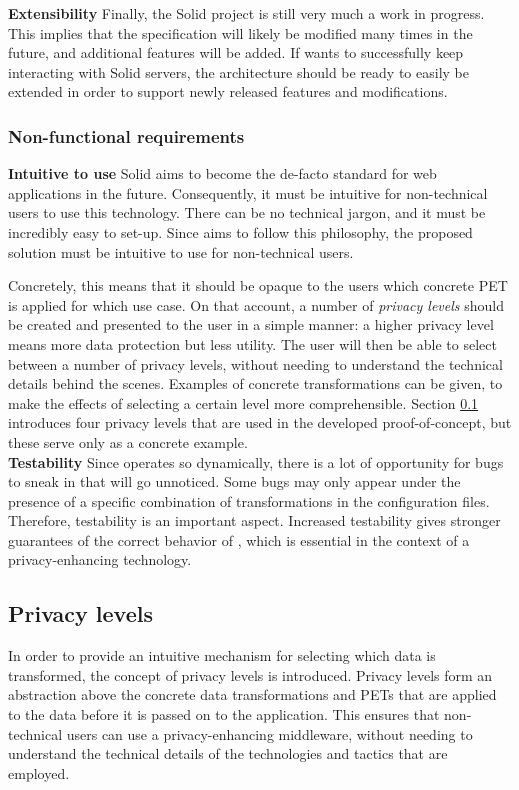 \noindent \textbf{Extensibility} Finally, the Solid project is still very much a work in progress. This implies that the specification will likely be modified many times in the future, and additional features will be added. If \middleware{} wants to successfully keep interacting with Solid servers, the architecture should be ready to easily be extended in order to support newly released features and modifications. 

\subsubsection{Non-functional requirements}
\textbf{Intuitive to use} Solid aims to become the de-facto standard for web applications in the future. Consequently, it must be intuitive for non-technical users to use this technology. There can be no technical jargon, and it must be incredibly easy to set-up. Since \middleware{} aims to follow this philosophy, the proposed solution must be intuitive to use for non-technical users. 

Concretely, this means that it should be opaque to the users which concrete PET is applied for which use case. On that account, a number of \textit{privacy levels} should be created and presented to the user in a simple manner: a higher privacy level means more data protection but less utility. The user will then be able to select between a number of privacy levels, without needing to understand the technical details behind the scenes. Examples of concrete transformations can be given, to make the effects of selecting a certain level more comprehensible. Section \ref{sec:privacylevels} introduces four privacy levels that are used in the developed proof-of-concept, but these serve only as a concrete example. \\

\noindent \textbf{Testability} Since \middleware{} operates so dynamically, there is a lot of opportunity for bugs to sneak in that will go unnoticed. Some bugs may only appear under the presence of a specific combination of transformations in the configuration files. Therefore, testability is an important aspect. Increased testability gives stronger guarantees of the correct behavior of \middleware{}, which is essential in the context of a privacy-enhancing technology.  

\subsection{Privacy levels}
\label{sec:privacylevels}
\noindent In order to provide an intuitive mechanism for selecting which data is transformed, the concept of privacy levels is introduced. Privacy levels form an abstraction above the concrete data transformations and \gls{PETs} that are applied to the data before it is passed on to the application. This ensures that non-technical users can use a privacy-enhancing middleware, without needing to understand the technical details of the technologies and tactics that are employed. 

